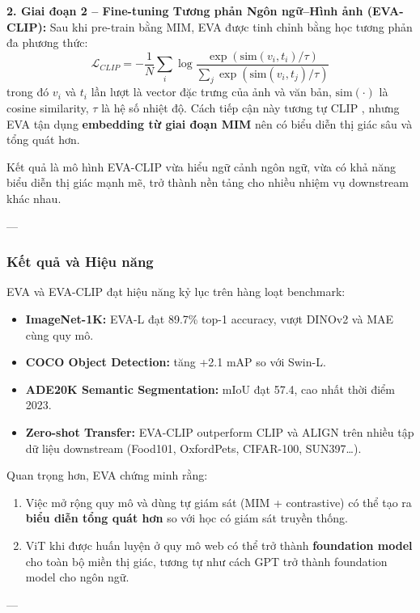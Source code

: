 \textbf{2. Giai đoạn 2 – Fine-tuning Tương phản Ngôn ngữ–Hình ảnh (EVA-CLIP):}  
Sau khi pre-train bằng MIM, EVA được tinh chỉnh bằng học tương phản đa phương thức:
\[
\mathcal{L}_{CLIP} = -\frac{1}{N}\sum_i \log \frac{\exp(\text{sim}(v_i, t_i)/\tau)}{\sum_j \exp(\text{sim}(v_i, t_j)/\tau)}
\]
trong đó $v_i$ và $t_i$ lần lượt là vector đặc trưng của ảnh và văn bản, $\text{sim}(\cdot)$ là cosine similarity, $\tau$ là hệ số nhiệt độ.  
Cách tiếp cận này tương tự CLIP \cite{Radford2021}, nhưng EVA tận dụng \textbf{embedding từ giai đoạn MIM} nên có biểu diễn thị giác sâu và tổng quát hơn.

Kết quả là mô hình EVA-CLIP vừa hiểu ngữ cảnh ngôn ngữ, vừa có khả năng biểu diễn thị giác mạnh mẽ, trở thành nền tảng cho nhiều nhiệm vụ downstream khác nhau.

---

\subsubsection{Kết quả và Hiệu năng}
\label{subsubsec:eva_results}

EVA và EVA-CLIP đạt hiệu năng kỷ lục trên hàng loạt benchmark:

\begin{itemize}
	\item \textbf{ImageNet-1K:} EVA-L đạt 89.7\% top-1 accuracy, vượt DINOv2 và MAE cùng quy mô.  
	\item \textbf{COCO Object Detection:} tăng +2.1 mAP so với Swin-L.  
	\item \textbf{ADE20K Semantic Segmentation:} mIoU đạt 57.4, cao nhất thời điểm 2023.
	\item \textbf{Zero-shot Transfer:} EVA-CLIP outperform CLIP và ALIGN trên nhiều tập dữ liệu downstream (Food101, OxfordPets, CIFAR-100, SUN397…).
\end{itemize}

Quan trọng hơn, EVA chứng minh rằng:
\begin{enumerate}
	\item Việc mở rộng quy mô và dùng tự giám sát (MIM + contrastive) có thể tạo ra \textbf{biểu diễn tổng quát hơn} so với học có giám sát truyền thống.
	\item ViT khi được huấn luyện ở quy mô web có thể trở thành \textbf{foundation model} cho toàn bộ miền thị giác, tương tự như cách GPT trở thành foundation model cho ngôn ngữ.
\end{enumerate}

---


